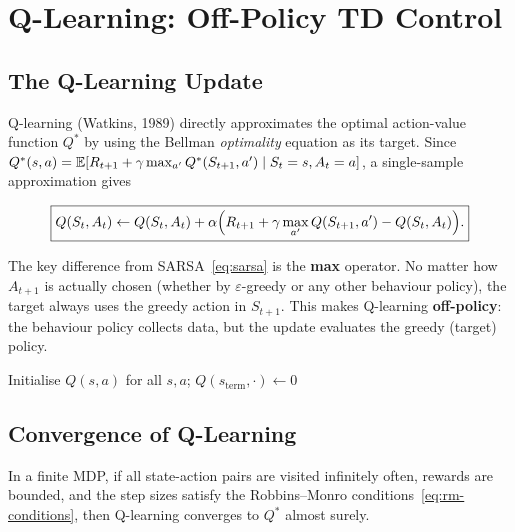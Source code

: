 \section{Q-Learning: Off-Policy TD Control}
\label{sec:q-learning}

\subsection{The Q-Learning Update}

Q-learning (Watkins, 1989) directly approximates the optimal action-value function $Q^*$ by using the Bellman \emph{optimality} equation as its target.  Since $Q^*(s,a) = \operatorname{\mathbb{E}}[R_{t+1}+\gamma\max_{a'}Q^*(S_{t+1},a') \mid S_t=s,A_t=a]$, a single-sample approximation gives

\begin{equation}
\label{eq:q-learning}
\boxed{Q(S_t,A_t) \leftarrow Q(S_t,A_t) + \alpha\Bigl(R_{t+1} + \gamma\max_{a'} Q(S_{t+1},a') - Q(S_t,A_t)\Bigr).}
\end{equation}

The key difference from SARSA~\eqref{eq:sarsa} is the \textbf{max} operator.  No matter how $A_{t+1}$ is actually chosen (whether by $\varepsilon$-greedy or any other behaviour policy), the target always uses the greedy action in $S_{t+1}$.  This makes Q-learning \textbf{off-policy}: the behaviour policy collects data, but the update evaluates the greedy (target) policy.

\begin{algorithm}[ht]
\caption{Q-Learning (Off-Policy TD Control)}
\label{alg:q-learning}
Initialise $Q(s,a)$ for all $s,a$; $Q(s_{\mathrm{term}},\cdot)\leftarrow 0$\;
\end{algorithm}

\subsection{Convergence of Q-Learning}

\begin{theorem}
\label{thm:q-learning-convergence}
In a finite MDP, if all state-action pairs are visited infinitely often, rewards are bounded, and the step sizes satisfy the Robbins--Monro conditions~\eqref{eq:rm-conditions}, then Q-learning converges to $Q^*$ almost surely.
\end{theorem}

